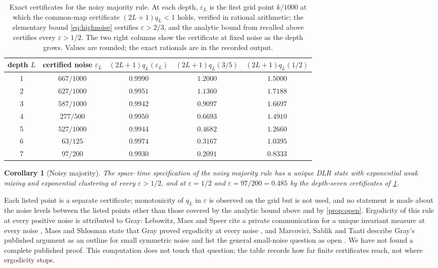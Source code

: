 \documentclass[11pt]{article}
\theoremstyle{plain}
\newtheorem{corollary}[theorem]{Corollary}
\theoremstyle{definition}
\theoremstyle{remark}
\newcommand{\eps}{\varepsilon}
\newcommand{\MAJSEVEN}{7 & $97/200$ & $0.9930$ & $\MAJSEVENA$ & $\MAJSEVENB$\\}
\newcommand{\MAJSEVENA}{0.2091}
\newcommand{\MAJSEVENB}{0.8333}
\begin{document}
\begin{table}[t]
\centering\small
\begin{tabular}{@{}ccccc@{}}
\toprule
depth $L$ & certified noise $\eps_L$ & $(2L+1)q_L(\eps_L)$ & $(2L+1)q_L(3/5)$ & $(2L+1)q_L(1/2)$\\
\midrule
1 & $667/1000$ & $0.9990$ & $1.2000$ & $1.5000$\\
2 & $627/1000$ & $0.9951$ & $1.1360$ & $1.7188$\\
3 & $587/1000$ & $0.9942$ & $0.9097$ & $1.6697$\\
4 & $277/500$ & $0.9950$ & $0.6693$ & $1.4910$\\
5 & $527/1000$ & $0.9944$ & $0.4682$ & $1.2660$\\
6 & $63/125$ & $0.9974$ & $0.3167$ & $1.0395$\\
\MAJSEVEN
\bottomrule
\end{tabular}
\caption{Exact certificates for the noisy majority rule. At each depth, $\eps_L$ is the first grid point $k/1000$ at which the common-map certificate $(2L+1)q_L<1$ holds, verified in rational arithmetic; the elementary bound \eqref{eq:highnoise} certifies $\eps>2/3$, and the analytic bound from \cite{LMS90} recalled above certifies every $\eps>1/2$. The two right columns show the certificate at fixed noise as the depth grows. Values are rounded; the exact rationals are in the recorded output.}
\label{tab:majority}
\end{table}

\begin{corollary}[Noisy majority]
\label{cor:majority}
The space--time specification of the noisy majority rule has a unique DLR state with exponential weak mixing and exponential clustering at every $\eps>1/2$, and at $\eps=1/2$ and $\eps=97/200=0.485$ by the depth-seven certificates of \cref{tab:majority}.
\end{corollary}

Each listed point is a separate certificate; monotonicity of $q_L$ in $\eps$ is observed on the grid but is not used, and no statement is made about the noise levels between the listed points other than those covered by the analytic bound above and by \cref{prop:open}. Ergodicity of this rule at every positive noise is attributed to Gray: Lebowitz, Maes and Speer cite a private communication for a unique invariant measure at every noise \cite[Example~1.1]{LMS90}, Maes and Shlosman state that Gray proved ergodicity at every noise \cite[Section~5]{MS91}, and Marcovici, Sablik and Taati describe Gray's published argument as an outline for small symmetric noise and list the general small-noise question as open \cite[Section~6, Problem~7]{MSTaati19}. We have not found a complete published proof. This computation does not touch that question; the table records how far finite certificates reach, not where ergodicity stops.
\end{document}
